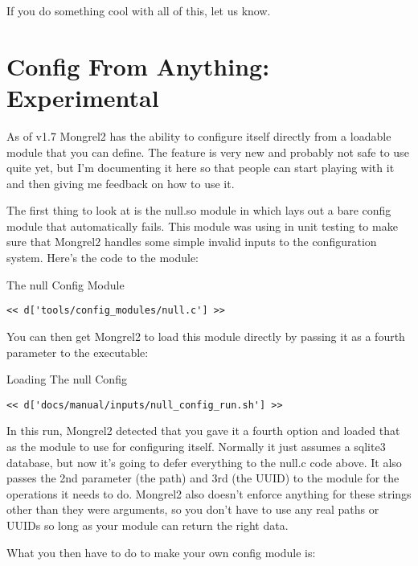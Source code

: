 If you do something cool with all of this, let us know.


\section{Config From Anything: Experimental}

As of v1.7 Mongrel2 has the ability to configure itself directly from a
loadable module that you can define.  The feature is very new and probably
not safe to use quite yet, but I'm documenting it here so that people
can start playing with it and then giving me feedback on how to use it.

The first thing to look at is the null.so module in 
which lays out a bare config module that automatically fails.  This module was
using in unit testing to make sure that Mongrel2 handles some simple invalid
inputs to the configuration system.  Here's the code to the module:

\begin{code}{The null Config Module}
\begin{lstlisting}
<< d['tools/config_modules/null.c'] >>
\end{lstlisting}
\end{code}

You can then get Mongrel2 to load this module directly by passing it as a
fourth parameter to the  executable:

\begin{code}{Loading The null Config}
\begin{lstlisting}
<< d['docs/manual/inputs/null_config_run.sh'] >>
\end{lstlisting}
\end{code}

In this run, Mongrel2 detected that you gave it a fourth option and 
loaded that as the module to use for configuring itself.  Normally
it just assumes a sqlite3 database, but now it's going to defer
everything to the null.c code above.  It also passes the 2nd parameter
(the path) and 3rd (the UUID) to the module for the operations it
needs to do.  Mongrel2 also doesn't enforce anything for these strings
other than they were arguments, so you don't have to use any real paths
or UUIDs so long as your module can return the right data.

What you then have to do to make your own config module is:


